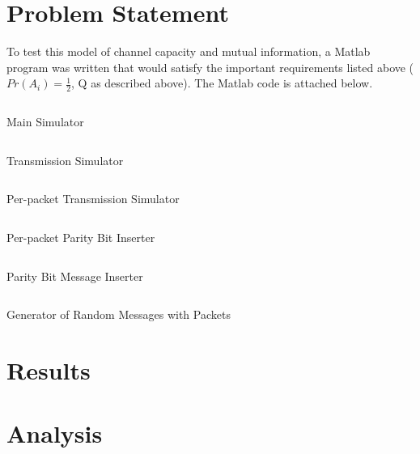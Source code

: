 \documentclass{article}
\begin{document}
   \section{Problem Statement}
      To test this model of channel capacity and mutual information,
      a Matlab program was written that would satisfy the important
      requirements listed above ($Pr(A_i) = \frac{1}{2}$, Q as described above).
      The Matlab code is attached below.

      \begin{listing}[H]
         \inputminted[linenos]{matlab}{../main.m}
         \caption{Main Simulator}
      \end{listing}
      \begin{listing}[H]
         \inputminted[linenos]{matlab}{../transmit.m}
         \caption{Transmission Simulator}
      \end{listing}
      \begin{listing}[H]
         \inputminted[linenos]{matlab}{../transmit_msg.m}
         \caption{Per-packet Transmission Simulator}
      \end{listing}
      \begin{listing}[H]
         \inputminted[linenos]{matlab}{../insert_parity_bit.m}
         \caption{Per-packet Parity Bit Inserter}
      \end{listing}
      \begin{listing}[H]
         \inputminted[linenos]{matlab}{../parity.m}
         \caption{Parity Bit Message Inserter}
      \end{listing}
      \begin{listing}[H]
         \inputminted[linenos]{matlab}{../generate_random_msg.m}
         \caption{Generator of Random Messages with Packets}
      \end{listing}
   \section{Results}
   \section{Analysis}
\end{document}

